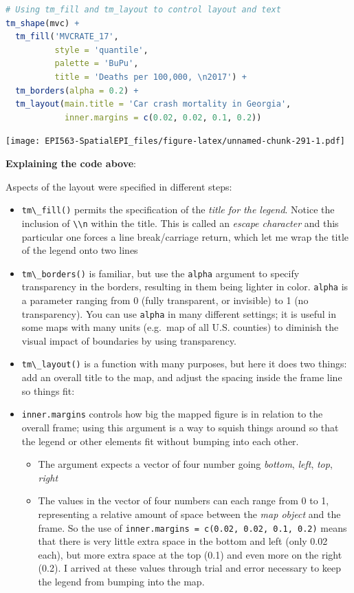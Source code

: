 \documentclass[
]{book}
\newcommand{\passthrough}[1]{#1}
\providecommand{\tightlist}{%
  \setlength{\itemsep}{0pt}\setlength{\parskip}{0pt}}
\begin{document}
\begin{lstlisting}[language=R]
# Using tm_fill and tm_layout to control layout and text
tm_shape(mvc) +
  tm_fill('MVCRATE_17',
          style = 'quantile',
          palette = 'BuPu',
          title = 'Deaths per 100,000, \n2017') +
  tm_borders(alpha = 0.2) +
  tm_layout(main.title = 'Car crash mortality in Georgia',
            inner.margins = c(0.02, 0.02, 0.1, 0.2))
\end{lstlisting}

\texttt{[image: EPI563-SpatialEPI\_files/figure-latex/unnamed-chunk-291-1.pdf]}

\textbf{Explaining the code above}:

Aspects of the layout were specified in different steps:

\begin{itemize}
\tightlist
\item
  \passthrough{\lstinline!tm\_fill()!} permits the specification of the \emph{title for the legend}. Notice the inclusion of \passthrough{\lstinline!\\n!} within the title. This is called an \emph{escape character} and this particular one forces a line break/carriage return, which let me wrap the title of the legend onto two lines
\item
  \passthrough{\lstinline!tm\_borders()!} is familiar, but use the \passthrough{\lstinline!alpha!} argument to specify transparency in the borders, resulting in them being lighter in color. \passthrough{\lstinline!alpha!} is a parameter ranging from 0 (fully transparent, or invisible) to 1 (no transparency). You can use \passthrough{\lstinline!alpha!} in many different settings; it is useful in some maps with many units (e.g.~map of all U.S. counties) to diminish the visual impact of boundaries by using transparency.
\item
  \passthrough{\lstinline!tm\_layout()!} is a function with many purposes, but here it does two things: add an overall title to the map, and adjust the spacing inside the frame line so things fit:
\item
  \passthrough{\lstinline!inner.margins!} controls how big the mapped figure is in relation to the overall frame; using this argument is a way to squish things around so that the legend or other elements fit without bumping into each other.

  \begin{itemize}
  \tightlist
  \item
    The argument expects a vector of four number going \emph{bottom}, \emph{left}, \emph{top}, \emph{right}
  \item
    The values in the vector of four numbers can each range from 0 to 1, representing a relative amount of space between the \emph{map object} and the frame. So the use of \passthrough{\lstinline!inner.margins = c(0.02, 0.02, 0.1, 0.2)!} means that there is very little extra space in the bottom and left (only 0.02 each), but more extra space at the top (0.1) and even more on the right (0.2). I arrived at these values through trial and error necessary to keep the legend from bumping into the map.
  \end{itemize}
\end{itemize}
\end{document}
